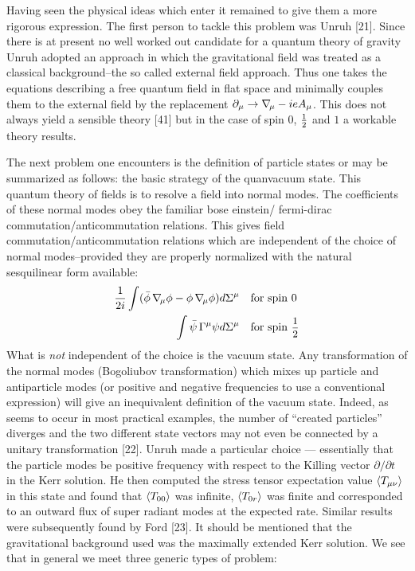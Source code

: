 Having seen the physical ideas which enter it remained to give them a
more rigorous expression. The first person to tackle this problem was
Unruh [21]. Since there is at present no well worked out candidate for a quantum theory
of gravity Unruh adopted an approach in which the gravitational field was treated as
a classical background--the so called external field approach. Thus one takes
the equations describing a free quantum field in flat space and minimally
couples them to the external field by the replacement $\partial_\mu \to \grad_\mu - ieA_\mu$.
This does not always yield a sensible theory [41] but in the case of spin 0, $\small{\frac{1}{2}}$ and $1$ a workable
theory results.

The next problem one encounters is the definition of particle states or may
be summarized as follows: the basic strategy of the quanvacuum state. This
quantum theory of fields is to resolve a field into normal modes. The coefficients
of these normal modes obey the familiar bose einstein/ fermi-dirac commutation/anticommutation
relations. This gives field commutation/anticommutation relations which are independent
of the choice of normal modes--provided they are properly normalized with the
natural sesquilinear form available:
\begin{align}
\frac{1}{2i} \int (\bar\phi\grad_\mu\phi - \phi\grad_\mu\phi) d\Sigma^\mu \quad & \text{for spin 0}\\
\int \bar\psi\GG^\mu\psi d\Sigma^\mu \quad & \text{for spin \small$\half$}
\end{align}
What is {\it not} independent of the choice is the vacuum state. Any transformation
of the normal modes (Bogoliubov transformation) which mixes up particle and
antiparticle modes (or positive and negative frequencies to use a conventional expression)
will give an inequivalent definition of the vacuum state. Indeed, as
seems to occur in most practical examples, the number of ``created particles'' diverges and
the two different state vectors may not even be connected by a unitary transformation [22].
Unruh made a particular choice --- essentially that the particle modes be positive
frequency with respect to the Killing vector $\partial/\partial t$ in the Kerr solution.
He then computed the stress tensor expectation value $\langle T_{\mu\nu} \rangle$ in this state and found
that $\langle T_{00} \rangle$ was infinite, $\langle T_{0r} \rangle$ was finite and corresponded to an outward flux of
super radiant modes at the expected rate. Similar results were subsequently found by Ford [23].
It should be mentioned that the gravitational background used was the maximally
extended Kerr solution. We see that in general we meet three generic types of problem:
